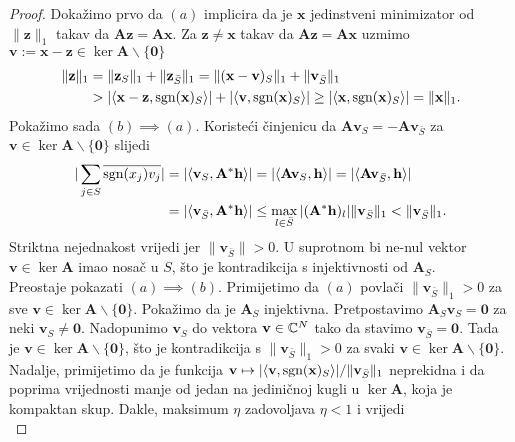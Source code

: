 \documentclass[a4paper,twoside,12pt]{memoir} %
\newcommand{\vect}[1]{\mathbf{#1}}
\renewcommand{\vec}{\vect}
\newcommand{\norm}[1]{\|{#1}\|}
\newcommand{\sgn}{\text{\normalfont{sgn}}}
\begin{document}
\begin{proof}
    Doka\v{z}imo prvo da $(a)$ implicira da je $\vec x$ jedinstveni minimizator od $\norm{\vec z}_1$ takav da $\vec{Az} = \vec{Ax}$. Za $\vec z \neq \vec x$ takav da $\vec{Az} = \vec {Ax}$ uzmimo $\vec v := \vec x - \vec z \in \ker \vec A \backslash \{\vec 0\}$
    \begin{align*}
        \norm{\vec z}_1 &= \norm{\vec z_S}_1 + \norm{\vec z_{\bar S} }_1 = \norm{(\vec x - \vec v)_S}_1 + \norm{\vec v_{\bar S}}_1  \\
        &> |\langle \vec x - \vec z, \sgn(\vec x)_S \rangle | + |\langle \vec v, \sgn(\vec x)_S \rangle| \geq |\langle \vec x, \sgn(\vec x)_S  \rangle| = \norm{\vec x}_1.
    \end{align*}
    \indent Poka\v{z}imo sada $(b)\implies(a)$. Koriste\'ci \v{c}injenicu da $\vec{Av}_S = - \vec {Av}_{\bar S}$ za $\vec v \in \ker \vec A \backslash \{\vec 0\}$ slijedi
    \begin{align*}
        |\sum_{j \in S} \overline{\sgn(x_j)v_j}| &= |\langle \vec v_S, \vec A^* \vec h \rangle|  = |\langle \vec{Av}_S, \vec h \rangle| = |\langle \vec{Av}_{\bar S}, \vec h\rangle| \\ 
        &= |\langle \vec v_{\bar S}, \vec{A}^*\vec h \rangle| \leq \max_{l \in \bar S} |(\vec A^* \vec h)_l| \norm{\vec v_{\bar S}}_1 < \norm{\vec v_{\bar S}}_1.
    \end{align*}
    Striktna nejednakost vrijedi jer $\norm{\vec v_{\bar S}} > 0$. U suprotnom bi ne-nul vektor $\vec v \in \ker \vec A$ imao nosa\v{c} u $S$, \v{s}to je kontradikcija s injektivnosti od $\vec A_S$.\\
    \indent Preostaje pokazati $(a) \implies (b)$. Primijetimo da $(a)$ povla\v{c}i $\norm{\vec v_{\bar S}}_1 > 0$ za sve $\vec v \in \ker \vec A \backslash \{\vec 0\}$. Poka\v{z}imo da je $\vec A_S$ injektivna. Pretpostavimo $\vec A_S \vec v_S = \vec 0$ za neki $\vec v_S \neq \vec 0$. Nadopunimo $\vec v_S$ do vektora $\vec v \in \C^N$ tako da stavimo $\vec v_{\bar S} = \vec 0$. Tada je $\vec v \in \ker \vec A \backslash \{\vec 0\}$, \v{s}to je kontradikcija s $\norm{\vec v_{\bar S}}_1 > 0$ za svaki $\vec v \in \ker \vec A \backslash \{\vec 0\}$. Nadalje, primijetimo da je funkcija $\vec v \mapsto |\langle \vec v, \sgn(\vec x)_S \rangle|/ \norm{\vec v_{\bar S}}_1$ neprekidna i da poprima vrijednosti manje od jedan na jedini\v{c}noj kugli u $\ker \vec A$, koja je kompaktan skup. Dakle, maksimum $\eta$ zadovoljava $\eta < 1$ i vrijedi 
    \begin{equation*}

\end{equation*}
\end{proof}
\end{document}
